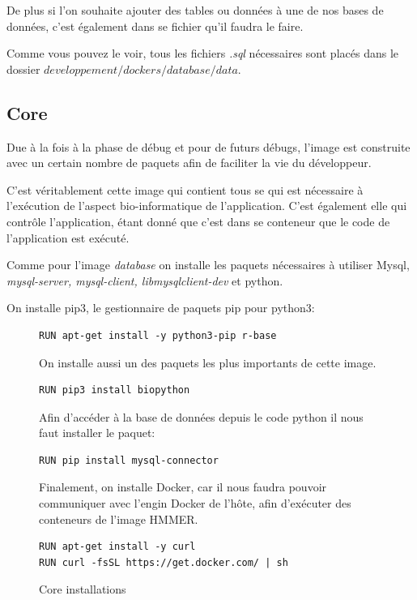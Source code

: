 De plus si l'on souhaite ajouter des tables ou données à une de nos bases de données, c'est également dans se fichier qu'il faudra le faire.

Comme vous pouvez le voir, tous les fichiers \emph{.sql} nécessaires sont placés dans le dossier \emph{$developpement/dockers/database/data$}.


\subsection{Core}
Due à la fois à la phase de débug et pour de futurs débugs, l'image est construite avec un certain nombre de paquets afin de faciliter la vie du développeur.

C'est véritablement cette image qui contient tous se qui est nécessaire à l'exécution de l'aspect bio-informatique de l'application. C'est également elle qui contrôle l'application, étant donné que c’est dans se conteneur que le code de l'application est exécuté.

Comme pour l'image \emph{database} on installe les paquets nécessaires à utiliser Mysql, \emph{mysql-server, mysql-client, libmysqlclient-dev} et python.

On installe pip3, le gestionnaire de paquets pip pour python3:

\begin{figure}[H] 
\centering 
\begin{lstlisting}[frame=single]
RUN apt-get install -y python3-pip r-base
\end{lstlisting}

On installe aussi un des paquets les plus importants de cette image.

\begin{lstlisting}[frame=single]
RUN pip3 install biopython
\end{lstlisting}

Afin d'accéder à la base de données depuis le code python il nous faut installer le paquet:

\begin{lstlisting}[frame=single]
RUN pip install mysql-connector
\end{lstlisting}

Finalement, on installe Docker, car il nous faudra pouvoir communiquer avec l'engin Docker de l'hôte, afin d'exécuter des conteneurs de l'image HMMER.

\begin{lstlisting}[frame=single]
RUN apt-get install -y curl
RUN curl -fsSL https://get.docker.com/ | sh
\end{lstlisting}
\caption[Core installations]{Core installations}
\label{fig:coreInstall} 
\end{figure}

